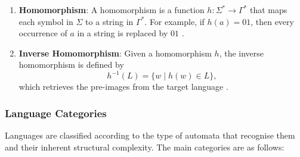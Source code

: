 \begin{enumerate}
    \item \textbf{Homomorphism}: A homomorphism is a function $h: \Sigma^\ast \to \Gamma^\ast$ that maps each symbol in $\Sigma$ to a string in $\Gamma^\ast$. For example, if $h(a) = 01$, then every occurrence of $a$ in a string is replaced by $01$ \cite{sipser2013introduction}.

    \item \textbf{Inverse Homomorphism}: Given a homomorphism $h$, the inverse homomorphism is defined by 
    \[
    h^{-1}(L) = \{w \mid h(w) \in L\},
    \]
    which retrieves the pre-images from the target language \cite{sipser2013introduction}.
\end{enumerate}

\subsubsection{Language Categories}
Languages are classified according to the type of automata that recognise them and their inherent structural complexity. The main categories are as follows:


